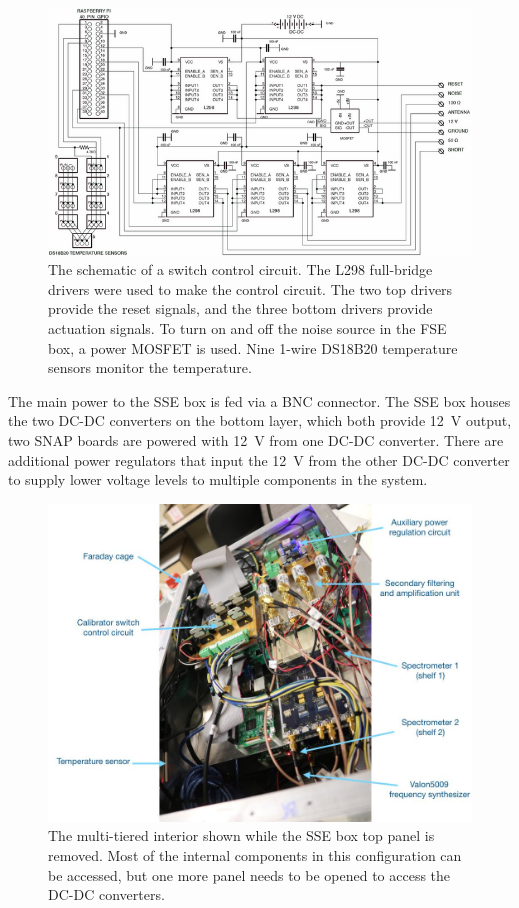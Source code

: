 \begin{figure}
	\centering
	\includegraphics[width=\linewidth]{Figures/calibrator}
	\caption{The schematic of a switch control circuit. The L298 full-bridge drivers were used to make the control circuit. The two top drivers provide the reset signals, and the three bottom drivers provide actuation signals. To turn on and off the noise source in the FSE box, a power MOSFET is used. Nine 1-wire DS18B20 temperature sensors monitor the temperature.}
	\label{Fig:calibrator}
\end{figure}

The main power to the SSE box is fed via a BNC connector. The SSE box houses the two DC-DC converters on the bottom layer, which both provide \SI{12}{\volt} output, two SNAP boards are powered with \SI{12}{\volt} from one DC-DC converter. There are additional power regulators that input the \SI{12}{\volt} from the other DC-DC converter to supply lower voltage levels to multiple components in the system.

\begin{figure}
	\centering
	\includegraphics[width=0.7\linewidth]{Figures/enclosure_ann}
	\caption{The multi-tiered interior shown while the SSE box top panel is removed. Most of the internal components in this configuration can be accessed, but one more panel needs to be opened to access the DC-DC converters.}
	\label{Fig:enclosure_ann}
\end{figure}

